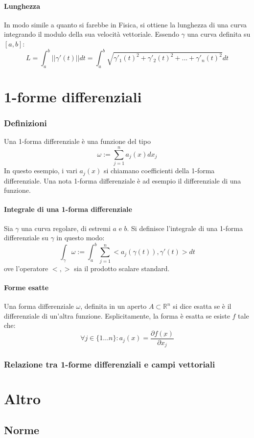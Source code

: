 \documentclass[a4paper,12pt]{article}
\begin{document}
\paragraph{Lunghezza}
In modo simile a quanto si farebbe in Fisica, si ottiene la lunghezza di una curva integrando il modulo della sua velocità vettoriale. Essendo $\gamma$ una curva definita su $[a, b]$:
$$L= \int_a^b ||\gamma'(t)|| dt = \int_a^b\sqrt{\gamma'_1(t)^2+\gamma'_2(t)^2+...+\gamma'_n(t)^2}dt$$


\section{1-forme differenziali}
\subsubsection{Definizioni}
Una 1-forma differenziale è una funzione del tipo
$$\omega := \sum_{j=1}^n a_j(x)dx_j$$
In questo esempio, i vari $a_j(x)$ si chiamano coefficienti della 1-forma differenziale.
Una nota 1-forma differenziale è ad esempio il differenziale di una funzione.
\paragraph{Integrale di una 1-forma differenziale}
Sia $\gamma$ una curva regolare, di estremi $a$ e $b$.
Si definisce l'integrale di una 1-forma differenziale su $\gamma$ in questo modo:
$$\int_\gamma \omega:=\int_a^b \sum_{j=1}^n <a_j(\gamma(t)), \gamma'(t)> dt$$
ove l'operatore $<,>$ sia il prodotto scalare standard.
\paragraph{Forme esatte}
Una forma differenziale $\omega$, definita in un aperto $A\subset\mathbb{R}^n$ si dice esatta se è il differenziale di un'altra funzione.
Esplicitamente, la forma è esatta se esiste $f$ tale che:
$$\forall j\in\{1 ... n\}: a_j(x) = \frac{\partial f(\underbar{x})}{\partial x_j}$$
\subsubsection{Relazione tra 1-forme differenziali e campi vettoriali}

\section{Altro}
\subsection{Norme}
\end{document}
